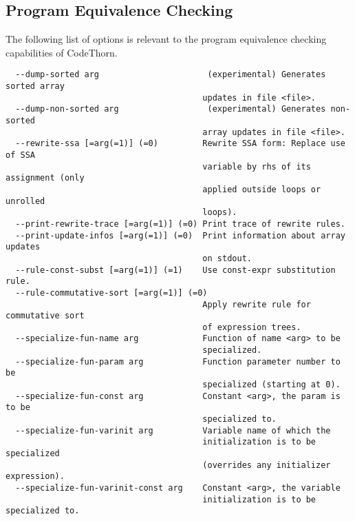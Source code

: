 \documentclass[natbib]{article}
\begin{document}
\subsection{Program Equivalence Checking}
The following list of options is relevant to the program equivalence checking capabilities of CodeThorn.
\begin{verbatim}
  --dump-sorted arg                      (experimental) Generates sorted array 
                                        updates in file <file>.
  --dump-non-sorted arg                  (experimental) Generates non-sorted 
                                        array updates in file <file>.
  --rewrite-ssa [=arg(=1)] (=0)         Rewrite SSA form: Replace use of SSA 
                                        variable by rhs of its assignment (only
                                        applied outside loops or unrolled 
                                        loops).
  --print-rewrite-trace [=arg(=1)] (=0) Print trace of rewrite rules.
  --print-update-infos [=arg(=1)] (=0)  Print information about array updates 
                                        on stdout.
  --rule-const-subst [=arg(=1)] (=1)    Use const-expr substitution rule.
  --rule-commutative-sort [=arg(=1)] (=0)
                                        Apply rewrite rule for commutative sort
                                        of expression trees.
  --specialize-fun-name arg             Function of name <arg> to be 
                                        specialized.
  --specialize-fun-param arg            Function parameter number to be 
                                        specialized (starting at 0).
  --specialize-fun-const arg            Constant <arg>, the param is to be 
                                        specialized to.
  --specialize-fun-varinit arg          Variable name of which the 
                                        initialization is to be specialized 
                                        (overrides any initializer expression).
  --specialize-fun-varinit-const arg    Constant <arg>, the variable 
                                        initialization is to be specialized to.
\end{verbatim}
\end{document}
